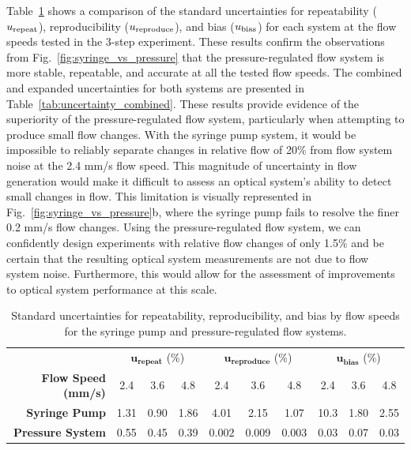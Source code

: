 \documentclass[12pt]{spieman}
\begin{document}
\begin{spacing}{2}
Table~\ref{tab:uncertainty_standard} shows a comparison of the standard uncertainties for repeatability ($u_\textnormal{repeat}$), reproducibility ($u_\textnormal{reproduce}$), and bias ($u_\textnormal{bias}$) for each system at the flow speeds tested in the 3-step experiment. These results confirm the observations from Fig.~\ref{fig:syringe_vs_pressure} that the pressure-regulated flow system is more stable, repeatable, and accurate at all the tested flow speeds. The combined and expanded uncertainties for both systems are presented in Table~\ref{tab:uncertainty_combined}. These results provide evidence of the superiority of the pressure-regulated flow system, particularly when attempting to produce small flow changes. With the syringe pump system, it would be impossible to reliably separate changes in relative flow of 20\% from flow system noise at the 2.4 mm/s flow speed. This magnitude of uncertainty in flow generation would make it difficult to assess an optical system’s ability to detect small changes in flow. This limitation is visually represented in Fig.~\ref{fig:syringe_vs_pressure}b, where the syringe pump fails to resolve the finer 0.2 mm/s flow changes. Using the pressure-regulated flow system, we can confidently design experiments with relative flow changes of only 1.5\% and be certain that the resulting optical system measurements are not due to flow system noise. Furthermore, this would allow for the assessment of improvements to optical system performance at this scale.

\begin{table}
    \caption {
        Standard uncertainties for repeatability, reproducibility, and bias by flow speeds for the syringe pump and pressure-regulated flow systems.
    }
    \label{tab:uncertainty_standard}
    \centering
    \begin{tabular}{rccccccccc}
        \addlinespace
        \toprule
            &
            \multicolumn{3}{c}{$\boldsymbol{u_\textbf{repeat}}$ (\%)}       & 
            \multicolumn{3}{c}{$\boldsymbol{u_\textbf{reproduce}}$ (\%)}    & 
            \multicolumn{3}{c}{$\boldsymbol{u_\textbf{bias}}$ (\%)}         \\
            \cmidrule(lr){2-4}
            \cmidrule(lr){5-7}
            \cmidrule(lr){8-10}
        \textbf{Flow Speed (mm/s)} & 2.4    & 3.6   & 4.8   & 2.4   & 3.6   & 4.8   & 2.4   & 3.6   & 4.8   \\
        \midrule
        \textbf{Syringe Pump}      & 1.31   & 0.90  & 1.86  & 4.01  & 2.15  & 1.07  & 10.3  & 1.80  & 2.55  \\
        \textbf{Pressure System}   & 0.55   & 0.45  & 0.39  & 0.002 & 0.009 & 0.003 & 0.03  & 0.07  & 0.03  \\
        \bottomrule
    \end{tabular}
\end{table}


\end{spacing}
\end{document}
